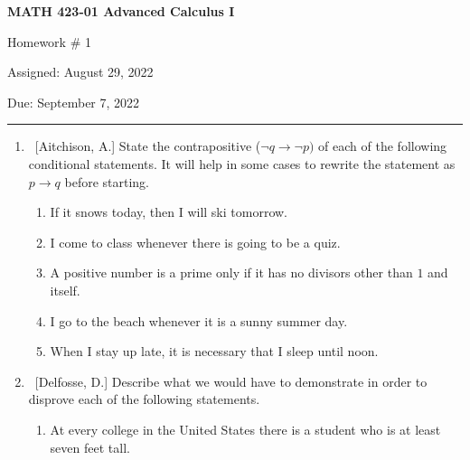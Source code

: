 \documentclass[10pt]{article}
\begin{document}
\pagestyle{empty}  %

\begin{center}  %

{\bf MATH 423-01  Advanced Calculus I

Homework \# 1

Assigned: August 29, 2022

Due: September 7, 2022}

\end{center}

\medskip

\hrule   %

\bigskip


\begin{enumerate}


\item  ~[Aitchison, A.] State the contrapositive ($\neg q \to \neg p)$ of each of the following conditional statements.  It will help in some cases to rewrite the statement as $p \to q$ before starting.

	\begin{enumerate}
	
	\item  If it snows today, then I will ski tomorrow.
	
	\item  I come to class whenever there is going to be a quiz.
	
	\item  A positive number is a prime only if it has no divisors other than $1$ and itself.
	
	\item  I go to the beach whenever it is a sunny summer day.
	
	\item  When I stay up late, it is necessary that I sleep until noon.
	
	\end{enumerate}

\item  ~[Delfosse, D.] Describe what we would have to demonstrate in order to disprove each of the following statements.

	\begin{enumerate}
	
	\item  At every college in the United States there is a student who is at least seven feet tall.
	

\end{enumerate}
\end{enumerate}
\end{document}
